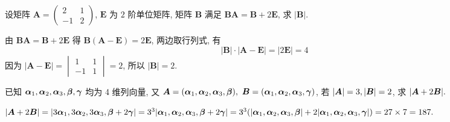 \begin{example}[2006 数一]
    设矩阵 $\boldsymbol{A}=\begin{pmatrix}
            2  & 1 \\
            -1 & 2
        \end{pmatrix}$, $\boldsymbol{E}$ 为 $2$ 阶单位矩阵, 矩阵 $\boldsymbol{B}$ 满足 $\boldsymbol{BA}=\boldsymbol{B}+2\boldsymbol{E}$, 求 $|\boldsymbol{B}|$.
\end{example}
\begin{solution}
    由 $\boldsymbol{BA}=\boldsymbol{B}+2\boldsymbol{E}$ 得 $\boldsymbol{B}(\boldsymbol{A}-\boldsymbol{E})=2\boldsymbol{E}$, 两边取行列式, 有
    $$|\boldsymbol{B}|\cdot|\boldsymbol{A}-\boldsymbol{E}|=|2\boldsymbol{E}|=4$$
    因为 $|\boldsymbol{A}-\boldsymbol{E}|=\begin{vmatrix}
            1  & 1 \\
            -1 & 1
        \end{vmatrix}=2$, 所以 $|\boldsymbol{B}|=2.$
\end{solution}

\begin{example}
    已知 $\vb*{\alpha}_1,\vb*{\alpha}_2,\vb*{\alpha}_3,\vb*{\beta},\vb*{\gamma}$ 均为 4 维列向量, 又 $\vb*{A}=(\vb*{\alpha}_1,\vb*{\alpha}_2,\vb*{\alpha}_3,\vb*{\beta}),~\vb*{B}=(\vb*{\alpha}_1,\vb*{\alpha}_2,\vb*{\alpha}_3,\vb*{\gamma})$, 
    若 $|\vb*{A}|=3,|\vb*{B}|=2$, 求 $|\vb*{A}+2\vb*{B}|.$
\end{example}
\begin{solution}
    $|\vb*{A}+2\vb*{B}|=|3\vb*{\alpha}_1,3\vb*{\alpha}_2,3\vb*{\alpha}_3,\vb*{\beta}+2\vb*{\gamma}|=3^3|\vb*{\alpha}_1,\vb*{\alpha}_2,\vb*{\alpha}_3,\vb*{\beta}+2\vb*{\gamma}|=3^3\qty(|\vb*{\alpha}_1,\vb*{\alpha}_2,\vb*{\alpha}_3,\vb*{\beta}|+2|\vb*{\alpha}_1,\vb*{\alpha}_2,\vb*{\alpha}_3,\vb*{\gamma}|)=27\times 7=187.$
\end{solution}
